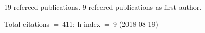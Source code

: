 19 refereed publications. 9 refeered publications as first author.

               Total citations~=~411; h-index~=~9 (2018-08-19)